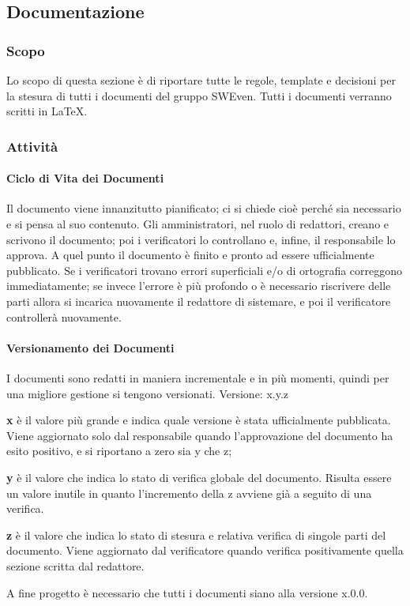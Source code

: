 \subsection{Documentazione}
\subsubsection{Scopo}
Lo scopo di questa sezione è di riportare tutte le regole, template e decisioni 
per la stesura di tutti i documenti del gruppo SWEven. \newline
Tutti i documenti verranno scritti in \LaTeX.

\subsubsection{Attività}
\paragraph{Ciclo di Vita dei Documenti}
Il documento viene innanzitutto pianificato; ci si chiede cioè perché sia necessario e si pensa al suo contenuto. 
Gli amministratori, nel ruolo di redattori, creano e scrivono il documento; poi i verificatori lo controllano 
e, infine, il responsabile lo approva. A quel punto il documento è finito e pronto ad essere ufficialmente 
pubblicato. \newline
Se i verificatori trovano errori superficiali e/o di ortografia correggono immediatamente;
se invece l'errore è più profondo o è necessario riscrivere delle parti allora si
incarica nuovamente il redattore di sistemare, e poi il verificatore controllerà nuovamente.

\paragraph{Versionamento dei Documenti}
I documenti sono redatti in maniera incrementale e in più momenti, quindi per una migliore 
gestione si tengono versionati.
\newline Versione: x.y.z
\begin{description}
    \item \textbf{x} è il valore più grande e indica quale versione è stata ufficialmente pubblicata.
            Viene aggiornato solo dal responsabile quando l'approvazione del documento ha esito positivo,
            e si riportano a zero sia y che z;
    \item \textbf{y} è il valore che indica lo stato di verifica globale del documento. Risulta essere un valore inutile in quanto l'incremento della z avviene già a seguito di una verifica.
    \item \textbf{z} è il valore che indica lo stato di stesura e relativa verifica di singole parti del documento. 
            Viene aggiornato dal verificatore quando verifica positivamente quella sezione scritta dal redattore.
\end{description}
A fine progetto è necessario che tutti i documenti siano alla versione x.0.0.

